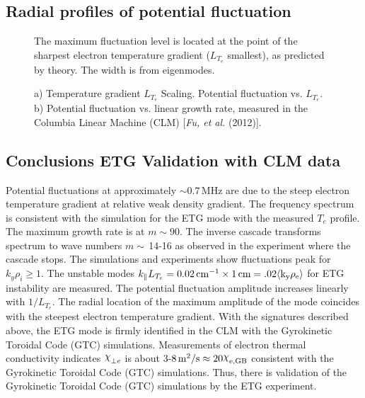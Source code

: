 \documentclass[a4paper,openany,12pt]{book}
\def\chix{\raise.5ex\hbox{$\chi$}}
\begin{document}
\subsection{Radial profiles of potential fluctuation}
%
\begin{figure}[H]
\centerline{}
\caption{The maximum fluctuation level is located at the point of the sharpest electron temperature gradient ($L_{T_e}$ smallest), as predicted by theory. The width is from eigenmodes.}
\label{F9.20}
\end{figure}
%
%
\begin{figure}[H]
\centerline{}
\centerline{}
\caption{a) Temperature gradient $L_{T_e}$ Scaling. Potential fluctuation vs. $L_{T_e}$. b) Potential fluctuation vs. linear growth rate, measured in the Columbia Linear Machine (CLM) [\emph{Fu, et al.}  (2012)].}
\label{F9.21}
\end{figure}
%
\subsection{Conclusions ETG Validation with CLM data}

Potential fluctuations at approximately $\sim 0.7\,$MHz are due to the steep electron temperature gradient at relative weak density gradient. The frequency spectrum is consistent with the simulation for the ETG mode with the measured 
$T_e$ profile. The maximum growth rate is at $m\sim 90$. The inverse cascade transforms spectrum to wave numbers $m\sim\,$14-16 as observed in the experiment where the cascade stops.
The simulations and experiments show fluctuations peak for $k_y\rho_i\ge 1$.
The unstable modes $k_\|L_{T_e}=0.02\,\rm cm^{-1}\times 1\,\rm cm =.02\langle k_y\rho_e\rangle$ for ETG instability are measured.
The potential fluctuation amplitude increases linearly with $1/L_{T_e}$.
The radial location of the maximum amplitude of the mode coincides with the steepest electron temperature gradient.
With the signatures described above, the ETG mode is firmly identified in the CLM with the Gyrokinetic Toroidal Code (GTC) simulations.
Measurements of electron thermal conductivity indicates $\chix_{\perp e}$ is about 3-$8\,\rm m^2/\rm s\approx 20\chix_{\rm e,GB}$ consistent with the Gyrokinetic Toroidal Code (GTC) simulations.
Thus, there is validation of the Gyrokinetic Toroidal Code (GTC) simulations by the ETG experiment.
\end{document}
